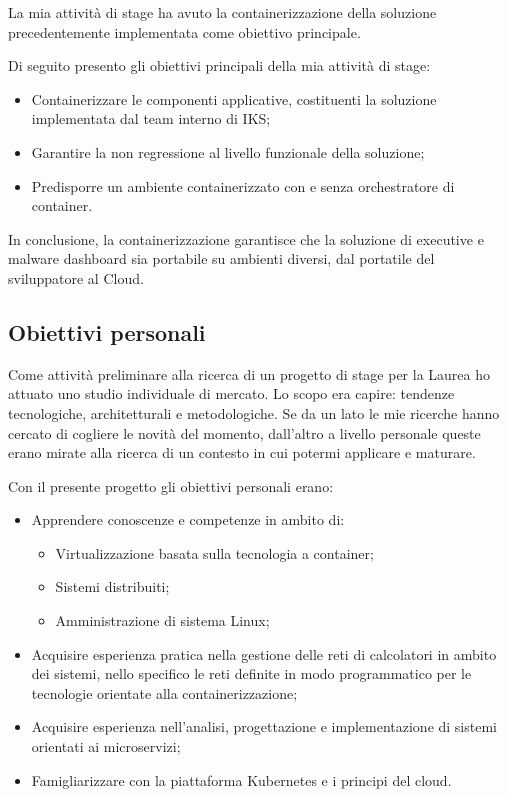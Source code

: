 La mia attività di stage ha avuto la containerizzazione della soluzione 
precedentemente implementata come obiettivo principale.

Di seguito presento gli obiettivi principali della mia attività di stage:

\begin{itemize}
	\item Containerizzare le componenti applicative, costituenti la 
soluzione implementata dal team interno di IKS; 
	\item Garantire la non regressione al livello funzionale della 
soluzione;
	\item Predisporre un ambiente containerizzato con e senza orchestratore 
di container.
\end{itemize} 

In conclusione, la containerizzazione garantisce che la soluzione di executive 
e malware dashboard sia portabile su ambienti diversi, dal portatile del 
sviluppatore al Cloud.  

\subsection{Obiettivi personali}
Come attività preliminare alla ricerca di un progetto di stage per la Laurea ho 
attuato uno studio individuale di mercato. Lo scopo era capire: tendenze 
tecnologiche, architetturali e metodologiche. Se da un lato le mie ricerche 
hanno cercato di cogliere le novità del momento, dall'altro a livello personale 
queste erano mirate alla ricerca di un contesto in cui potermi applicare e 
maturare. 

Con il presente progetto gli obiettivi personali erano:

\begin{itemize}
	\item Apprendere conoscenze e competenze in ambito di:
		\begin{itemize}
			\item Virtualizzazione basata sulla tecnologia a 
container; 
			\item Sistemi distribuiti;
			\item Amministrazione di sistema Linux;
	    \end{itemize}
	\item Acquisire esperienza pratica nella gestione delle reti di 
calcolatori in ambito dei sistemi, nello specifico le reti definite in modo 
programmatico per le tecnologie orientate alla containerizzazione; 
	\item Acquisire esperienza nell'analisi, progettazione e 
implementazione di sistemi orientati ai microservizi;
	\item Famigliarizzare con la piattaforma Kubernetes e i principi del 
\gls{cloud}.
\end{itemize} 

